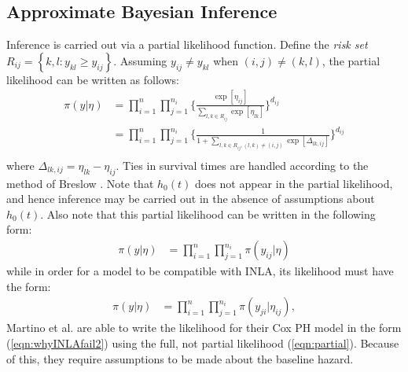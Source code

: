\documentclass[serif,10pt]{wiley-article}
\begin{document}
\subsection{Approximate Bayesian Inference}

Inference is carried out via a partial likelihood function. Define the \textit{risk set} $R_{ij} = \left\{k,l : y_{kl} \geq y_{ij}\right\}$. Assuming $y_{ij} \neq y_{kl}$ when $(i,j) \neq (k,l)$, the partial likelihood can be written as follows: 
\begin{equation}\begin{aligned}\label{eqn:partial}
\pi(y|\eta) &= \prod_{i=1}^{n}\prod_{j=1}^{n_{i}} \bigg\{\frac{\exp[\eta_{ij}]}{{\sum_{l,k\in R_{ij}}^{}\exp[\eta_{lk}]}}\bigg \}^{d_{ij}} \\
&= \prod_{i=1}^{n}\prod_{j=1}^{n_{i}} \bigg\{\frac{1}{{1 + \sum_{l,k\in R_{ij} , (l,k) \neq (i,j)}\exp[\Delta_{lk,ij}]}}\bigg \}^{d_{ij}} \\
\end{aligned}\end{equation}
where $\Delta_{lk,ij} = \eta_{lk} - \eta_{ij}$. Ties in survival times are handled according to the method of Breslow \cite{Breslow}. Note that $h_{0}(t)$ does not appear in the partial likelihood, and hence inference may be carried out in the absence of assumptions about $h_{0}(t)$. Also note that this partial likelihood can be written in the following form:
\begin{equation}\begin{aligned}\label{eqn:whyINLAfail1}
\pi(y|\eta) &= \prod_{i=1}^{n}\prod_{j=1}^{n_{i}} \pi(y_{ij}|\eta)
\end{aligned}\end{equation}
while in order for a model to be compatible with INLA, its likelihood must have the form:
\begin{equation}\begin{aligned}\label{eqn:whyINLAfail2}
\pi(y|\eta) &= \prod_{i=1}^{n}\prod_{j=1}^{n_{i}} \pi(y_{ji}|\eta_{ij}),
\end{aligned}\end{equation}
Martino et al. \cite{inlacoxph} are able to write the likelihood for their Cox PH model in the form (\ref{eqn:whyINLAfail2}) using the full, not partial likelihood (\ref{eqn:partial}). Because of this, they require assumptions to be made about the baseline hazard.
\end{document}
